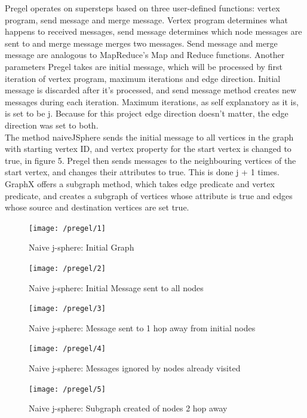 \documentclass{article}
\theoremstyle{definition}
\begin{document}
Pregel operates on supersteps based on three user-defined functions: vertex program, send message and merge message. Vertex program determines what happens to received messages, send message determines which node messages are sent to and merge message merges two messages. Send message and merge message are analogous to MapReduce's Map and Reduce functions. Another parameters Pregel takes are initial message, which will be processed by first iteration of vertex program, maximum iterations and edge direction. Initial message is discarded after it's processed, and send message method creates new messages during each iteration. Maximum iterations, as self explanatory as it is, is set to be j. Because for this project edge direction doesn't matter, the edge direction was set to both. \\

The method naiveJSphere sends the initial message to all vertices in the graph with starting vertex ID, and vertex property for the start vertex is changed to true, in figure 5. Pregel then sends messages to the neighbouring vertices of the start vertex, and changes their attributes to true. This is done j + 1 times. GraphX offers a subgraph method, which takes edge predicate and vertex predicate, and creates a subgraph of vertices whose attribute is true and edges whose source and destination vertices are set true. 

\begin{figure}[H]
\centering
\texttt{[image: /pregel/1]}
\caption{Naive j-sphere: Initial Graph}
\end{figure}

\begin{figure}[H]
\centering
\texttt{[image: /pregel/2]}
\caption{Naive j-sphere: Initial Message sent to all nodes}
\end{figure}

\begin{figure}[H]
\centering
\texttt{[image: /pregel/3]}
\caption{Naive j-sphere: Message sent to 1 hop away from initial nodes}
\end{figure}

\begin{figure}[H]
\centering
\texttt{[image: /pregel/4]}
\caption{Naive j-sphere: Messages ignored by nodes already visited}
\end{figure}

\begin{figure}[H]
\centering
\texttt{[image: /pregel/5]}
\caption{Naive j-sphere: Subgraph created of nodes 2 hop away}
\end{figure}
\end{document}
